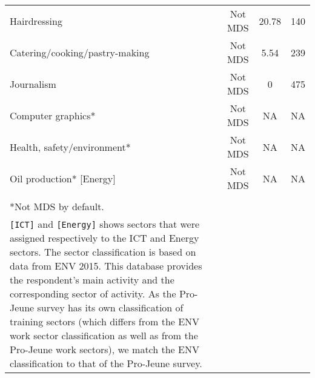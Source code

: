 {\begin{longtable}{m{9cm}ccc}
Hairdressing&Not MDS&20.78&140\\
Catering/cooking/pastry-making&Not MDS&5.54&239\\
Journalism&Not MDS&0&475\\
Computer graphics*&Not MDS&NA&NA\\
Health, safety/environment*&Not MDS&NA&NA\\
Oil production* [Energy]&Not MDS&NA&NA\\
\midrule
\begin{minipage}{17cm}
\small{
{\textit Notes:} \\
*Not MDS   by default. \\
\texttt{[ICT]} and \texttt{[Energy]} shows sectors that were assigned respectively to the ICT and Energy sectors.
The sector classification is based on data from ENV 2015. This database provides the respondent's main activity and the corresponding sector of activity.  As the Pro-Jeune survey has its own classification of training sectors (which differs from the ENV work sector classification as well as from the Pro-Jeune work sectors), we match the ENV classification to that of the Pro-Jeune survey.  
}
\end{minipage} \\* \bottomrule
\end{longtable}
}
